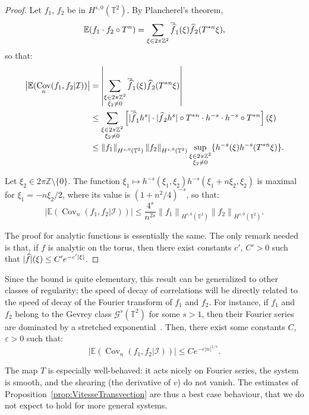 \documentclass[10pt]{amsart}
\theoremstyle{definition}\newtheorem{defi}[theo]{Definition}\newtheorem{rema}[theo]{Remark}\newtheorem{exam}[theo]{Example}\newtheorem{exem}[theo]{Example}\newtheorem{nota}[theo]{Notation}
\DeclareMathOperator{\Cov}{Cov}
\newcommand{\Z}{\mathbb{Z}}
\newcommand{\Ebb}{\mathbb{E}}
\newcommand{\Tbb}{\mathbb{T}}
\newcommand{\Gcal}{\mathcal{G}}
\newcommand{\Ical}{\mathcal{I}}
\newcommand{\norm}[2]{\left\| #1 \right\|_{#2}}
\renewcommand*{\hat}[1]{\mathchoice{\widehat{#1}}{\widehat{#1}}{\oldhat{#1}}{\oldhat{#1}}}\let\oldforall\forall
\renewcommand*{\forall}{\mathrel{\oldforall}}
\begin{document}
\begin{proof}
Let $f_1$, $f_2$ be in $H^{s,0} (\Tbb^2)$. By Plancherel's theorem,
\[
\Ebb (f_1 \cdot f_2 \circ T^n) = \sum_{\xi \in 2\pi\Z^2} \overline{\hat{f}}_1 (\xi) \hat{f}_2 (T^{*n} \xi),
\]
so that:
\begin{align*}
\big| \Ebb (\Cov_n (f_1, f_2|\Ical)) \big| & = \left| \sum_{\substack{\xi \in 2\pi\Z^2 \\ \xi_2 \neq 0}} \overline{\hat{f}}_1 (\xi) \hat{f}_2 (T^{*n} \xi) \right| \\
& \leq \sum_{\substack{\xi \in 2\pi\Z^2 \\ \xi_2 \neq 0}} \left[|\overline{\hat{f}}_1 h^s| \cdot |\hat{f}_2 h^s| \circ T^{*n} \cdot h^{-s} \cdot h^{-s} \circ T^{*n} \right] (\xi) \\
& \leq \norm{f_1}{H^{s,0} (\Tbb^2)} \norm{f_2}{H^{s,0} (\Tbb^2)} \sup_{\substack{\xi \in 2\pi\Z^2 \\ \xi_2 \neq 0}} \{ h^{-s} (\xi) h^{-s} (T^{*n} \xi) \}.
\end{align*}

Let $\xi_2 \in 2\pi\Z \setminus \{0\}$. The function $\xi_1 \mapsto h^{-s} (\xi_1, \xi_2) h^{-s} (\xi_1+n \xi_2, \xi_2)$ is maximal for $\xi_1 = -n \xi_2 /2$, where its value is $(1+n^2/4)^{-s}$, so that:
\[
\big| \Ebb (\Cov_n (f_1, f_2|\Ical)) \big|
\leq \frac{4^s}{n^{2s}} \norm{f_1}{H^{s,0} (\Tbb^2)} \norm{f_2}{H^{s,0} (\Tbb^2)}.
\]

The proof for analytic functions is essentially the same. The only remark needed is that, if $f$ is analytic on the torus, then there exist constants $c'$, $C'>0$ such that $|\hat{f}| (\xi) \leq C' e^{-c' |\xi|}$.
\end{proof}


Since the bound is quite elementary, this result can be generalized to other classes of regularity; the speed of decay of correlations will be directly related to the speed of decay of the Fourier transform of $f_1$ and $f_2$. For instance, if $f_1$ and $f_2$ belong to the Gevrey class $\Gcal^s (\Tbb^2)$ for some $s >1$, then their Fourier series are dominated by a stretched exponential~\cite[Theorem~1.6.1]{Rodino:1993}. Then, there exist some constants $C$, $\varepsilon >0$ such that:
\[
\big| \Ebb (\Cov_n (f_1, f_2|\Ical)) \big|
\leq C e^{-\varepsilon |n|^{1/s}}.
\]


The map $T$ is especially well-behaved: it acts nicely on Fourier series, the system is smooth, and the shearing (the derivative of $v$) do not vanish. The estimates of Proposition~\ref{prop:VitesseTransvection} are thus a best case behaviour, that we do not expect to hold for more general systems.
\end{document}
